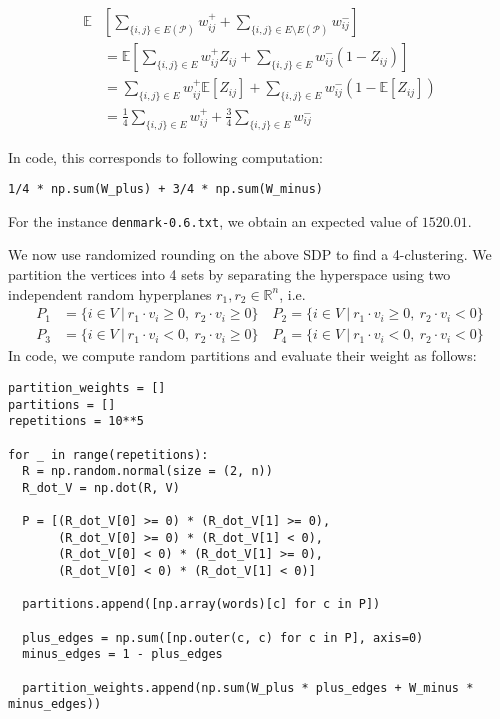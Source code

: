 \documentclass{article}
\begin{document}
\begin{align*}
    \mathbb{E}&\left[ \sum_{\{i,j\} \in E(\mathcal{P})} w_{ij}^+ + \sum_{\{i,j\} \in E \setminus E(\mathcal{P})} w_{ij}^-\right]\\
    &= \mathbb{E}\left[ \sum_{\{i,j\} \in E} w_{ij}^+ Z_{ij} + \sum_{\{i,j\} \in E} w_{ij}^- (1 - Z_{ij})\right]\\
    &= \sum_{\{i,j\} \in E} w_{ij}^+ \mathbb{E}[Z_{ij}] + \sum_{\{i,j\} \in E} w_{ij}^- (1 - \mathbb{E}[Z_{ij}])\\
    &= \frac{1}{4}\sum_{\{i,j\} \in E} w_{ij}^+ + \frac{3}{4}\sum_{\{i,j\} \in E} w_{ij}^-
\end{align*}

In code, this corresponds to following computation:
\begin{lstlisting}
1/4 * np.sum(W_plus) + 3/4 * np.sum(W_minus)
\end{lstlisting}
For the instance \texttt{denmark-0.6.txt}, we obtain an expected value of $1520.01$.\vspace{1em}

We now use randomized rounding on the above SDP to find a 4-clustering. We partition the vertices into 4 sets by separating the hyperspace using two independent random hyperplanes $r_1, r_2 \in \mathbb{R}^n$, i.e.
\begin{align*}
    P_1 &= \{i \in V\ |\ r_1 \cdot v_i \ge 0,\ r_2 \cdot v_i \ge 0 \}\quad P_2 = \{i \in V\ |\ r_1 \cdot v_i \ge 0,\ r_2 \cdot v_i < 0 \}\\
    P_3 &= \{i \in V\ |\ r_1 \cdot v_i < 0,\ r_2 \cdot v_i \ge 0 \}\quad P_4 = \{i \in V\ |\ r_1 \cdot v_i < 0,\ r_2 \cdot v_i < 0 \}
\end{align*}
In code, we compute random partitions and evaluate their weight as follows:

\begin{lstlisting}
partition_weights = []
partitions = []
repetitions = 10**5

for _ in range(repetitions):
  R = np.random.normal(size = (2, n))
  R_dot_V = np.dot(R, V)
  
  P = [(R_dot_V[0] >= 0) * (R_dot_V[1] >= 0), 
       (R_dot_V[0] >= 0) * (R_dot_V[1] < 0), 
       (R_dot_V[0] < 0) * (R_dot_V[1] >= 0),
       (R_dot_V[0] < 0) * (R_dot_V[1] < 0)]
  
  partitions.append([np.array(words)[c] for c in P])
  
  plus_edges = np.sum([np.outer(c, c) for c in P], axis=0)
  minus_edges = 1 - plus_edges  
  
  partition_weights.append(np.sum(W_plus * plus_edges + W_minus * minus_edges))
\end{lstlisting}
\end{document}
